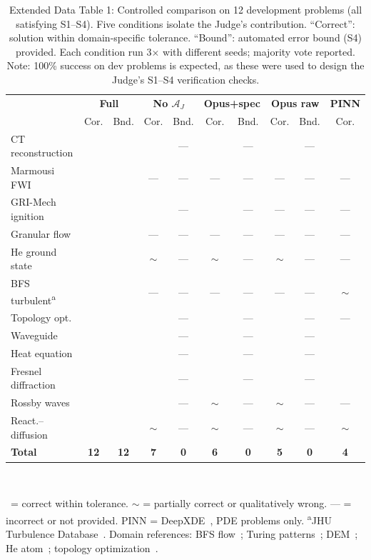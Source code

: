 \documentclass[11pt,a4paper]{article}
\newcommand{\Agent}{\mathcal{A}}
\newcommand{\cmark}{\checkmark}
\begin{document}
\begin{table}[htbp]
\centering
\caption{Extended Data Table 1: Controlled comparison on 12 development problems (all satisfying S1--S4). Five conditions isolate the Judge's contribution. ``Correct'': solution within domain-specific tolerance. ``Bound'': automated error bound (S4) provided. Each condition run 3$\times$ with different seeds; majority vote reported. Note: 100\% success on dev problems is expected, as these were used to design the Judge's S1--S4 verification checks.}
\label{tab:comparison}
\footnotesize
\begin{tabularx}{\textwidth}{Xcc|cc|cc|cc|c}
\toprule
& \multicolumn{2}{c|}{\textbf{Full}} & \multicolumn{2}{c|}{\textbf{No $\Agent_J$}} & \multicolumn{2}{c|}{\textbf{Opus+spec}} & \multicolumn{2}{c|}{\textbf{Opus raw}} & \textbf{PINN} \\
& Cor. & Bnd. & Cor. & Bnd. & Cor. & Bnd. & Cor. & Bnd. & Cor. \\
\midrule
CT reconstruction & \cmark & \cmark & \cmark & --- & \cmark & --- & \cmark & --- & \cmark \\
Marmousi FWI & \cmark & \cmark & --- & --- & --- & --- & --- & --- & --- \\
GRI-Mech ignition & \cmark & \cmark & \cmark & --- & \cmark & --- & --- & --- & --- \\
Granular flow & \cmark & \cmark & --- & --- & --- & --- & --- & --- & --- \\
He ground state & \cmark & \cmark & $\sim$ & --- & $\sim$ & --- & $\sim$ & --- & --- \\
BFS turbulent\textsuperscript{a} & \cmark & \cmark & --- & --- & --- & --- & --- & --- & $\sim$ \\
Topology opt. & \cmark & \cmark & \cmark & --- & \cmark & --- & \cmark & --- & --- \\
Waveguide & \cmark & \cmark & \cmark & --- & \cmark & --- & \cmark & --- & \cmark \\
Heat equation & \cmark & \cmark & \cmark & --- & \cmark & --- & \cmark & --- & \cmark \\
Fresnel diffraction & \cmark & \cmark & \cmark & --- & \cmark & --- & \cmark & --- & \cmark \\
Rossby waves & \cmark & \cmark & \cmark & --- & $\sim$ & --- & $\sim$ & --- & --- \\
React.--diffusion & \cmark & \cmark & $\sim$ & --- & $\sim$ & --- & $\sim$ & --- & $\sim$ \\
\midrule
\textbf{Total} & \textbf{12} & \textbf{12} & \textbf{7} & \textbf{0} & \textbf{6} & \textbf{0} & \textbf{5} & \textbf{0} & \textbf{4} \\
\bottomrule
\end{tabularx}\\[3pt]
\raggedright\scriptsize \cmark\ = correct within tolerance. $\sim$ = partially correct or qualitatively wrong. --- = incorrect or not provided. PINN = DeepXDE~\cite{lu2021deepxde}, PDE problems only. \textsuperscript{a}JHU Turbulence Database~\cite{li2008jhtdb}. Domain references: BFS flow~\cite{armaly1983}; Turing patterns~\cite{turing1952}; DEM~\cite{cundall1979}; He atom~\cite{hylleraas1929}; topology optimization~\cite{bendsoe1988,sigmund2001}.
\end{table}
\end{document}
